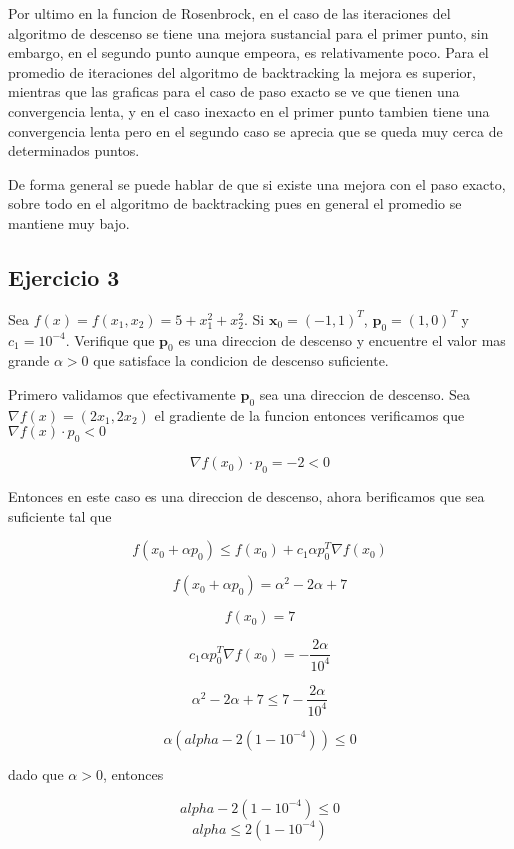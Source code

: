 \documentclass[11pt]{article}
\begin{document}
Por ultimo en la funcion de Rosenbrock, en el caso de las iteraciones
del algoritmo de descenso se tiene una mejora sustancial para el primer
punto, sin embargo, en el segundo punto aunque empeora, es relativamente
poco. Para el promedio de iteraciones del algoritmo de backtracking la
mejora es superior, mientras que las graficas para el caso de paso
exacto se ve que tienen una convergencia lenta, y en el caso inexacto en
el primer punto tambien tiene una convergencia lenta pero en el segundo
caso se aprecia que se queda muy cerca de determinados puntos.

De forma general se puede hablar de que si existe una mejora con el paso
exacto, sobre todo en el algoritmo de backtracking pues en general el
promedio se mantiene muy bajo.

    \subsection{Ejercicio 3}\label{ejercicio-3}

    Sea \(f(x) = f(x_1, x_2) = 5 + x_1^2 + x_2^2\). Si
\(\textbf{x}_0 = (-1, 1)^T\), \(\textbf{p}_0 = (1, 0)^T\) y
\(c_1 = 10^{-4}\). Verifique que \(\textbf{p}_0\) es una direccion de
descenso y encuentre el valor mas grande \(\alpha > 0\) que satisface la
condicion de descenso suficiente.

    Primero validamos que efectivamente \(\textbf{p}_0\) sea una direccion
de descenso. Sea \(\nabla f(x) = (2 x_1, 2 x_2)\) el gradiente de la
funcion entonces verificamos que \(\nabla f(x) \cdot p_0 < 0\)

    \[
\nabla f(x_0) \cdot p_0 = -2 < 0
\]

    Entonces en este caso es una direccion de descenso, ahora berificamos
que sea suficiente tal que

    \[
    f(x_0 + \alpha p_0) \leq f(x_0) + c_1 \alpha p_0^T \nabla f(x_0)
\]

    \[
    f(x_0 + \alpha p_0) = \alpha^2 - 2 \alpha + 7  
\]

    \[
    f(x_0) = 7
\]

    \[
c_1 \alpha p_0^T \nabla f(x_0) = -\frac{2 \alpha}{10^4}
\]

    \[
     \alpha^2 - 2 \alpha + 7  \leq 7 - \frac{2 \alpha}{10^4}
\]

    \[
    \alpha (alpha - 2(1 - 10^{-4})) \leq 0
\]

    dado que \(\alpha >0\), entonces

    \[
    alpha - 2(1 - 10^{-4}) \leq 0
\] \[
    alpha \leq 2(1 - 10^{-4})
\]
\end{document}
